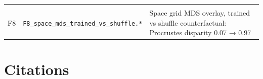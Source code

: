 \begin{longtable}[]{@{}lll@{}}
\begin{minipage}[t]{0.30\columnwidth}
\end{minipage}\tabularnewline
\begin{minipage}[t]{0.30\columnwidth}\raggedright
F8\strut
\end{minipage} & \begin{minipage}[t]{0.30\columnwidth}\raggedright
\texttt{F8\_space\_mds\_trained\_vs\_shuffle.*}\strut
\end{minipage} & \begin{minipage}[t]{0.30\columnwidth}\raggedright
Space grid MDS overlay, trained vs shuffle counterfactual: Procrustes disparity 0.07 → 0.97\strut
\end{minipage}\tabularnewline
\bottomrule
\end{longtable}

\medskip

\section{Citations}

